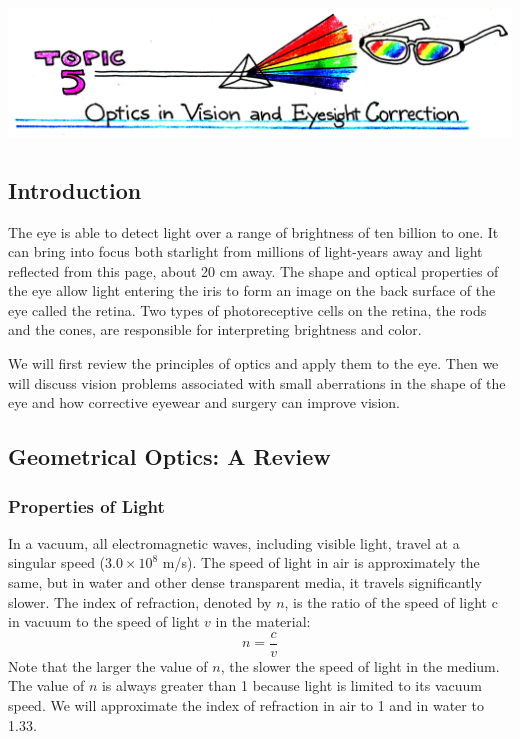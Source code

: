 \setcounter{chapter}{5}
\setcounter{section}{0}
\setcounter{figure}{0}
\setcounter{equation}{0}
\setcounter{table}{0}
\chapter*{\includegraphics[width=\textwidth]{./figures/Topic5/Topic5.jpg}}

\section{Introduction}

The eye is able to detect light over a range of brightness of ten billion to one. It can bring into focus both starlight from millions of light-years away and light reflected from this page, about 20 cm away.  The shape and optical properties of the eye allow light entering the iris to form an image on the back surface of the eye called the retina.  Two types of photoreceptive cells on the retina, the rods and the cones, are responsible for interpreting brightness and color.  

We will first review the principles of optics and apply them to the eye.  Then we will discuss vision problems associated with small aberrations in the shape of the eye and how corrective eyewear and surgery can improve vision.

\section{Geometrical Optics: A Review}

\subsection{Properties of Light}
In a vacuum, all electromagnetic waves, including visible light, travel at a singular speed ($3.0\times10^8$ m/s).  The speed of light in air is approximately the same, but in water and other dense transparent media, it travels significantly slower.  The index of refraction, denoted by $n$, is the ratio of the speed of light c in vacuum to the speed of light $v$ in the material:
\begin{equation}\label{eqn5-1}
n = \frac{c}{v}
\end{equation}
Note that the larger the value of $n$, the slower the speed of light in the medium. The value of $n$ is always greater than 1 because light is limited to its vacuum speed. We will approximate the index of refraction in air to 1 and in water to 1.33.

